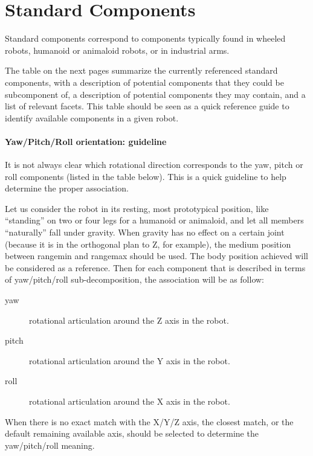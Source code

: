 \section{Standard Components}

Standard components correspond to components typically found in wheeled
robots, humanoid or animaloid robots, or in industrial arms.


The table on the next pages summarize the currently referenced standard
components, with a description of potential components that they could
be subcomponent of, a description of potential components they may
contain, and a list of relevant facets. This table should be seen as a
quick reference guide to identify available components in a given
robot.

\paragraph{Yaw/Pitch/Roll orientation: guideline}


It is not always clear which rotational direction corresponds to the
yaw, pitch or roll components (listed in the table below). This is a
quick guideline to help determine the proper association.


Let us consider the robot in its resting, most prototypical position,
like “standing” on two or four legs for a humanoid or animaloid, and
let all members “naturally” fall under gravity. When gravity has no
effect on a certain joint (because it is in the orthogonal plan to Z,
for example), the medium position between rangemin and rangemax should
be used. The body position achieved will be considered as a reference.
Then for each component that is described in terms of yaw/pitch/roll
sub-decomposition, the association will be as follow:

\begin{description}
\item[yaw] rotational articulation around the Z axis in the robot.
\item[pitch] rotational articulation around the Y axis in the robot.
\item[roll] rotational articulation around the X axis in the robot.
\end{description}

When there is no exact match with the X/Y/Z axis, the closest match, or
the default remaining available axis, should be selected to determine
the yaw/pitch/roll meaning.

